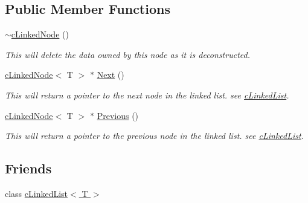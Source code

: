 \subsection*{Public Member Functions}
\begin{DoxyCompactItemize}
\item 
\hypertarget{classc_linked_node_adb8af44378d6d47b439ec7950f579bb3}{
\hyperlink{classc_linked_node_adb8af44378d6d47b439ec7950f579bb3}{$\sim$cLinkedNode} ()}
\label{classc_linked_node_adb8af44378d6d47b439ec7950f579bb3}

\begin{DoxyCompactList}\small\item\em This will delete the data owned by this node as it is deconstructed. \end{DoxyCompactList}\item 
\hypertarget{classc_linked_node_ac375aeade4f13f07a601732e80b49e8b}{
\hyperlink{classc_linked_node}{cLinkedNode}$<$ T $>$ $\ast$ \hyperlink{classc_linked_node_ac375aeade4f13f07a601732e80b49e8b}{Next} ()}
\label{classc_linked_node_ac375aeade4f13f07a601732e80b49e8b}

\begin{DoxyCompactList}\small\item\em This will return a pointer to the next node in the linked list. see \hyperlink{classc_linked_list}{cLinkedList}. \end{DoxyCompactList}\item 
\hypertarget{classc_linked_node_a6481dec71a6adffa72fd9621f366253a}{
\hyperlink{classc_linked_node}{cLinkedNode}$<$ T $>$ $\ast$ \hyperlink{classc_linked_node_a6481dec71a6adffa72fd9621f366253a}{Previous} ()}
\label{classc_linked_node_a6481dec71a6adffa72fd9621f366253a}

\begin{DoxyCompactList}\small\item\em This will return a pointer to the previous node in the linked list. see \hyperlink{classc_linked_list}{cLinkedList}. \end{DoxyCompactList}\end{DoxyCompactItemize}
\subsection*{Friends}
\begin{DoxyCompactItemize}
\item 
\hypertarget{classc_linked_node_a5b538a518f67ed3377a26348f2b536da}{
class \hyperlink{classc_linked_node_a5b538a518f67ed3377a26348f2b536da}{cLinkedList$<$ T $>$}}
\label{classc_linked_node_a5b538a518f67ed3377a26348f2b536da}

\end{DoxyCompactItemize}


